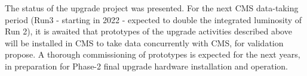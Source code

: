 The status of the upgrade project was presented. For the next CMS data-taking period (Run3 - starting in 2022 - expected to double the integrated luminosity of Run 2), it is awaited that prototypes of the upgrade activities described above will be installed in CMS to take data concurrently with CMS, for validation propose. A thorough commissioning of prototypes is expected for the next years, in preparation for Phase-2 final upgrade hardware installation and operation.